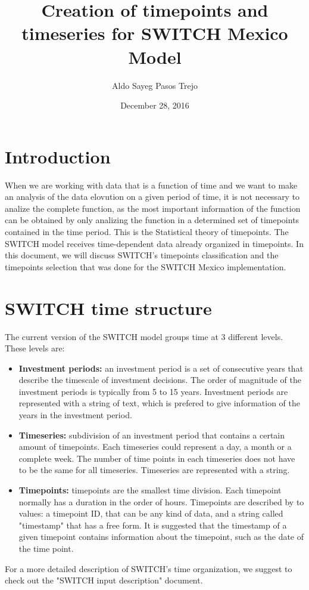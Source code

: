 \documentclass{article}
\author[1,2]{Aldo Sayeg Pasos Trejo}
\affil[1]{\textit{Physics Departament. Facultad de Ciencias. Universidad Nacional Autónoma de México}}
\affil[2]{\textit{Visiting Student Researcher for the Berkeley Energy and Climate Institute at University of California, Berkeley}}
\date{December 28, 2016}
\title{Creation of timepoints and timeseries for SWITCH Mexico Model}
\begin{document}
\maketitle
\section{Introduction}
When we are working with data that is a function of time and we want to make an analysis of the data elovution on a given period of time, it is not necessary to analize the complete function, as the most important information of the function can be obtained by only analizing the function in a determined set of timepoints contained in the time period. This is the Statistical theory of timepoints. The SWITCH model receives time-dependent data already organized in timepoints. In this document, we will discuss SWITCH's timepoints classification and the timepoints selection that was done for the SWITCH Mexico implementation.
\section{SWITCH time structure}
The current version of the SWITCH model groups time at 3 different levels. These levels are:
\begin{itemize}
\item \textbf{Investment periods: } an investment period is a set of consecutive years that describe the timescale of investment decisions. The order of magnitude of the investment periods is typically from 5 to 15 years. Investment periods are represented with a string of text, which is prefered to give information of the years in the investment period.
\item \textbf{Timeseries: } subdivision of an investment period that contains a certain amount of timepoints. Each timeseries could represent a day, a month or a complete week. The number of time points in each timeseries does not have to be the same for all timeseries. Timeseries are represented with a string.    
\item \textbf{Timepoints: } timepoints are the smallest time division. Each timepoint normally has a duration in the order of hours. Timepoints are described by to values: a timepoint ID, that can be any kind of data, and a string called "timestamp" that has a free form. It is suggested that the timestamp of a given timepoint contains information about the timepoint, such as the date of the time point.
\end{itemize}
For a more detailed description of SWITCH's time organization, we suggest to check out the "SWITCH input description" document\cite{input}.
\end{document}
